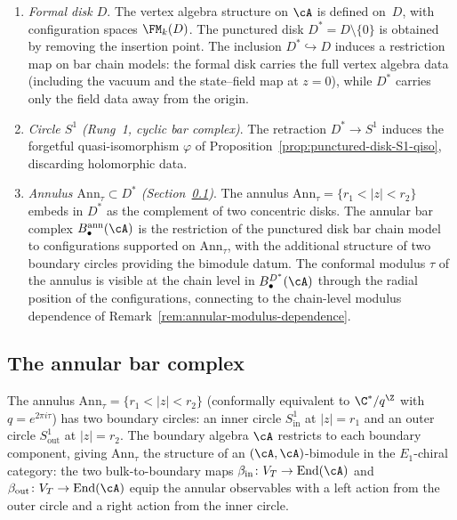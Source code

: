 \begin{enumerate}[label=\textup{(\roman*)}]
\item \emph{Formal disk $D$}.
 The vertex algebra structure on $\cA$ is defined on~$D$,
 with configuration spaces $\FM_k(D)$. The punctured
 disk $D^*=D\setminus\{0\}$ is obtained by removing the
 insertion point. The inclusion $D^*\hookrightarrow D$
 induces a restriction map on bar chain models: the
 formal disk carries the full vertex algebra data
 (including the vacuum and the state--field map at
 $z=0$), while $D^*$ carries only the field data away
 from the origin.

\item \emph{Circle $S^1$
 \textup{(}Rung~1, cyclic bar complex\textup{)}}.
 The retraction $D^*\to S^1$ induces the forgetful
 quasi-isomorphism $\varphi$ of
 Proposition~\ref{prop:punctured-disk-S1-qiso},
 discarding holomorphic data.

\item \emph{Annulus $\mathrm{Ann}_\tau\subset D^*$
 \textup{(}Section~\textup{\ref{subsec:annular-bar-complex}}\textup{)}}.
 The annulus $\mathrm{Ann}_\tau=\{r_1<|z|<r_2\}$ embeds
 in $D^*$ as the complement of two concentric disks.
 The annular bar complex
 $B^{\mathrm{ann}}_\bullet(\cA)$
 is the restriction of the punctured disk bar chain
 model to configurations supported on
 $\mathrm{Ann}_\tau$, with the additional structure of
 two boundary circles providing the bimodule datum.
 The conformal modulus $\tau$ of the annulus is visible
 at the chain level in $B^{D^*}_\bullet(\cA)$ through
 the radial position of the configurations, connecting
 to the chain-level modulus dependence of
 Remark~\ref{rem:annular-modulus-dependence}.
\end{enumerate}

\subsection{The annular bar complex}
\label{subsec:annular-bar-complex}

The annulus $\mathrm{Ann}_\tau=\{r_1<|z|<r_2\}$ (conformally equivalent
to $\C^*/q^{\Z}$ with $q=e^{2\pi i\tau}$) has two boundary
circles: an inner circle $S^1_{\mathrm{in}}$ at $|z|=r_1$ and
an outer circle $S^1_{\mathrm{out}}$ at $|z|=r_2$. The boundary
algebra $\cA$ restricts to each boundary component, giving
$\mathrm{Ann}_\tau$ the structure of an $(\cA,\cA)$-bimodule in the
$E_1$-chiral category: the two bulk-to-boundary maps
$\beta_{\mathrm{in}}\colon V_T\to\operatorname{End}(\cA)$
and $\beta_{\mathrm{out}}\colon V_T\to\operatorname{End}(\cA)$
equip the annular observables with a left action from the outer
circle and a right action from the inner circle.

